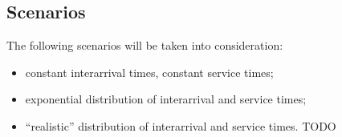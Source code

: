 \subsection{Scenarios}
The following scenarios will be taken into consideration:
\begin{itemize}
    \item constant interarrival times, constant service times;
    \item exponential distribution of interarrival and service times;
    \item ``realistic'' distribution of interarrival and service times. TODO
\end{itemize}
